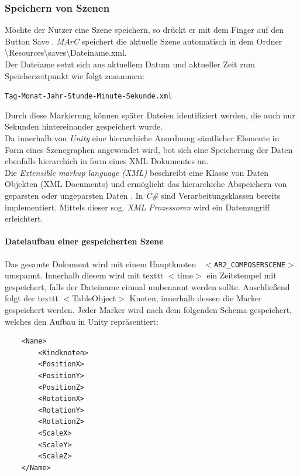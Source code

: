 \subsubsection{Speichern von Szenen}
\label{Speichern}
Möchte der Nutzer eine Szene speichern, so drückt er mit dem Finger auf den Button \glqq Save \grqq{}. \textit{MArC} speichert die aktuelle Szene automatisch in dem Ordner \glqq \textbackslash Resources\textbackslash saves\textbackslash Dateiname.xml\grqq{}.\\
Der Dateiame setzt sich aus aktuellem Datum und aktueller Zeit zum Speicherzeitpunkt wie folgt zusammen:
\begin{center}
	\texttt{Tag-Monat-Jahr-Stunde-Minute-Sekunde.xml}
\end{center}
Durch diese Markierung können später Dateien identifiziert werden, die auch nur Sekunden hintereinander gespeichert wurde.\\
Da innerhalb von \textit{Unity} eine hierarchiche Anordnung sämtlicher Elemente in Form eines Szenegraphen angewendet wird, bot sich eine Speicherung der Daten ebenfalls hierarchich in form eines XML Dokumentes an.\\
Die \textit{Extensible markup language (XML)} beschreibt eine Klasse von Daten Objekten (XML Documents) und ermöglicht das hierarchiche Abspeichern von geparsten oder ungeparsten Daten \cite{bray1998extensible}. In \textit{C\#} sind Verarbeitungsklassen bereits implementiert. Mittels dieser sog. \textit{XML Prozessoren} wird ein Datenzugriff erleichtert.

\paragraph{Dateiaufbau einer gespeicherten Szene}
Das gesamte Dokument wird mit einem Hauptknoten  \texttt{ $<$AR2\_COMPOSERSCENE$>$} umspannt. Innerhalb diesem wird mit texttt{ $<$time$>$}
ein Zeitstempel mit gespeichert, falls der Dateiname einmal umbenannt werden sollte.
Anschließend folgt der  texttt{ $<$TableObject$>$} Knoten, innerhalb dessen die Marker gespeichert werden. Jeder Marker wird nach dem folgenden Schema gespeichert, welches den Aufbau in Unity repräsentiert:


 \begin{lstlisting}
	<Name>
		<Kindknoten>
		<PositionX>
		<PositionY>
		<PositionZ>
		<RotationX>
		<RotationY>
		<RotationZ>
		<ScaleX>
		<ScaleY>
		<ScaleZ>
	</Name>
 \end{lstlisting}


